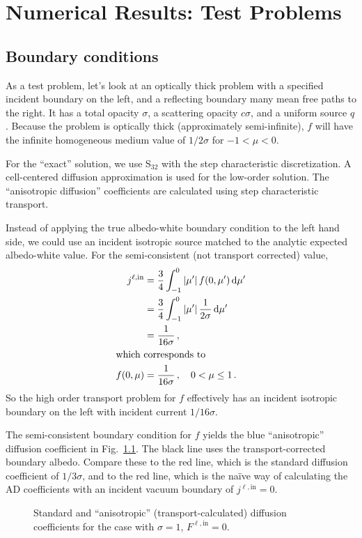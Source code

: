 
\chapter{Numerical Results: Test Problems}

\section{Boundary conditions}
As a test problem, let's look at an optically thick problem with a specified
incident boundary on the left, and a reflecting boundary many mean free paths to
the right. It has a total opacity $\sigma$, a scattering opacity $c\sigma$, and
a uniform source $q$. Because the problem is optically thick (approximately
semi-infinite), $f$ will have the infinite homogeneous medium value of
$1/2\sigma$ for $-1 < \mu < 0$.

For the ``exact'' solution, we use S$_{32}$ with the step characteristic
discretization. A cell-centered diffusion approximation is used for
the low-order solution. The ``anisotropic diffusion'' coefficients are
calculated using step characteristic transport.

Instead of applying the true albedo-white boundary condition to the
left hand side, we could use an incident isotropic source matched to the
analytic expected albedo-white value. For the semi-consistent (not transport
corrected) value,
\begin{align*}
  j^{\ell,\mathrm{in}} &= \frac{3}{4} \int_{-1}^{0} \left| \mu' \right| f(0, \mu') \mathop{}\!\mathrm{d}\mu' \\
  &= \frac{3}{4} \int_{-1}^{0} \left| \mu' \right| \frac{1}{2\sigma} \mathop{}\!\mathrm{d}\mu' \\
  &= \frac{1}{16\sigma} \,,
  \\ 
  \intertext{which corresponds to}
  f(0, \mu) &=  \frac{1}{16\sigma} \,,\quad 0 < \mu \le 1\,.
\end{align*}
So the high order transport problem for $f$ effectively has an incident
isotropic boundary on the left with incident current $1/16\sigma$.

The semi-consistent boundary condition for $f$ yields the blue ``anisotropic''
diffusion coefficient in
Fig.~\ref{fig:bndycondDcoeff}.  The black line uses the transport-corrected
boundary albedo.  Compare these to the red line, which is the
standard diffusion coefficient of $1/3\sigma$, and to the red line, which
is the na\"ive way of calculating the AD coefficients with an incident
vacuum boundary of $j^{\ell,\mathrm{in}}=0$.
\begin{figure}[htb]
  \centering
  
  \caption{Standard and ``anisotropic'' (transport-calculated) diffusion
  coefficients for the case with $\sigma=1$, $F^{\ell,\mathrm{in}}=0$.}
  \label{fig:bndycondDcoeff}
\end{figure}

